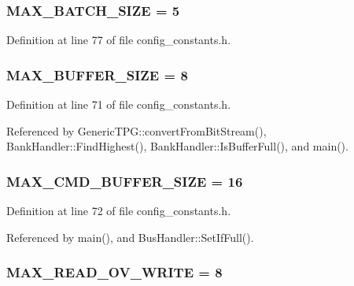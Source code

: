 \subsubsection[{MAX\_\-BATCH\_\-SIZE}]{ {\bf MAX\_\-BATCH\_\-SIZE} = 5}\label{config__constants_8h_840d31886703a5f59cd2f607b00caed1}




Definition at line 77 of file config\_\-constants.h.
\subsubsection[{MAX\_\-BUFFER\_\-SIZE}]{ {\bf MAX\_\-BUFFER\_\-SIZE} = 8}\label{config__constants_8h_5834e03c9871421dab2ce0050888d6f9}




Definition at line 71 of file config\_\-constants.h.

Referenced by GenericTPG::convertFromBitStream(), BankHandler::FindHighest(), BankHandler::IsBufferFull(), and main().
\subsubsection[{MAX\_\-CMD\_\-BUFFER\_\-SIZE}]{ {\bf MAX\_\-CMD\_\-BUFFER\_\-SIZE} = 16}\label{config__constants_8h_7b3f5203e83ae79d6e9c365f6286dc97}




Definition at line 72 of file config\_\-constants.h.

Referenced by main(), and BusHandler::SetIfFull().
\subsubsection[{MAX\_\-READ\_\-OV\_\-WRITE}]{ {\bf MAX\_\-READ\_\-OV\_\-WRITE} = 8}\label{config__constants_8h_91edaf1971d0cd92284086fee6f41660}




